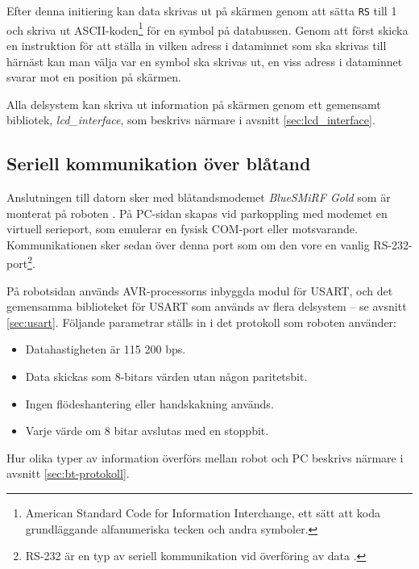 Efter denna initiering kan data skrivas ut på skärmen genom att sätta \verb|RS| till 1 och skriva ut ASCII-koden\footnote{American Standard Code for Information Interchange, ett sätt att koda grundläggande alfanumeriska tecken och andra symboler.} för en symbol på databussen. Genom att först skicka en instruktion för att ställa in vilken adress i dataminnet som ska skrivas till härnäst kan man välja var en symbol ska skrivas ut, en viss adress i dataminnet svarar mot en position på skärmen.

Alla delsystem kan skriva ut information på skärmen genom ett gemensamt bibliotek, \textit{lcd\_interface}, som beskrivs närmare i avsnitt \ref{sec:lcd_interface}.


\subsection{Seriell kommunikation över blåtand}
Anslutningen till datorn sker med blåtandsmodemet \emph{BlueSMiRF Gold} som är monterat på roboten \cite{bluetooth}. På PC-sidan skapas vid parkoppling med modemet en virtuell serieport, som emulerar en fysisk COM-port eller motsvarande. Kommunikationen sker sedan över denna port som om den vore en vanlig RS-232-port\footnote{RS-232 är en typ av seriell kommunikation vid överföring av data \cite{rs232}.}. 

På robotsidan används AVR-processorns inbyggda modul för USART, och det gemensamma biblioteket för USART som används av flera delsystem -- se avsnitt \ref{sec:usart}. Följande parametrar ställs in i det protokoll som roboten använder:
\begin{itemize}
\item Datahastigheten är 115 200 bps.
\item Data skickas som 8-bitars värden utan någon paritetsbit.
\item Ingen flödeshantering eller handskakning används.
\item Varje värde om 8 bitar avslutas med en stoppbit.
\end{itemize}

Hur olika typer av information överförs mellan robot och PC beskrivs närmare i avsnitt \ref{sec:bt-protokoll}.
